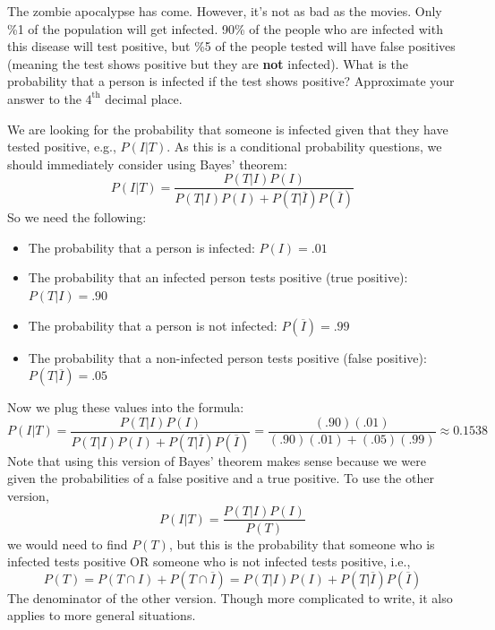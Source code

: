 \documentclass{exam}
\begin{document}
\begin{questions}
    
\question The zombie apocalypse has come. However, it's not as bad as the movies. Only \%1 of the population will get infected. 90\% of the people who are infected with this disease will test positive, but \%5 of the people tested will have false positives (meaning the test shows positive but they are \textbf{not} infected). What is the probability that a person is infected if the test shows positive? Approximate your answer to the $4^{\text{th}}$ decimal place.
    \begin{solution}
        We are looking for the probability that someone is infected given that they have tested positive, e.g., $P(I|T)$. As this is a conditional probability questions, we should immediately consider using Bayes' theorem:
         \[ P(I|T)=\displaystyle \frac{P(T|I)P(I)}{P(T|I)P(I)+P(T|\overline{I})P(\overline{I})} \]
        So we need the following:
        \begin{itemize}
            \item The probability that a person is infected: $P(I)=.01$
            \item The probability that an infected person tests positive (true positive): $P(T|I)=.90$
            \item The probability that a person is not infected: $P(\overline{I})=.99$
            \item The probability that a non-infected person tests positive (false positive): $P(T|\overline{I})=.05$ 
        \end{itemize}
        
        Now we plug these values into the formula:
         \[ P(I|T)=\displaystyle \frac{P(T|I)P(I)}{P(T|I)P(I)+P(T|\overline{I})P(\overline{I})}
         =\frac{(.90)(.01)}{(.90)(.01)+(.05)(.99)}\approx 0.1538
         \]
        Note that using this version of Bayes' theorem makes sense because we were given the probabilities of a false positive and a true positive. To use the other version,
        $$P(I|T)=\frac{P(T|I)P(I)}{P(T)}$$
        we would need to find $P(T)$, but this is the probability that someone who is infected tests positive OR someone who is not infected tests positive, i.e.,
        $$P(T)=P(T\cap I)+P(T\cap \overline{I})=P(T|I)P(I)+P(T|\overline{I})P(\overline{I})$$
        The denominator of the other version. Though more complicated to write, it also applies to more general situations.
    \end{solution}


\end{questions}
\end{document}
